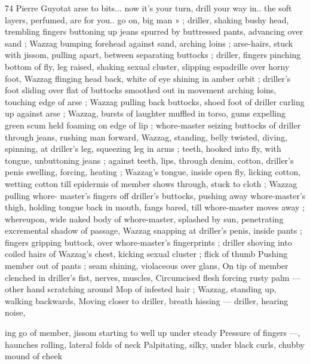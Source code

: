74 Pierre Guyotat
arse to bits... now it's your turn, drill your way in.. the soft layers,
perfumed, are for you.. go on, big man » ; driller, shaking bushy head,
trembling fingers buttoning up jeans spurred by buttressed pants,
advancing over sand ; Wazzag bumping forehead against sand,
arching loins ; arse-hairs, stuck with jissom, pulling apart, between
separating buttocks ; driller, fingers pinching bottom of fly, leg
raised, shaking sexual cluster, slipping espadrille over horny foot,
Wazzag flinging head back, white of eye shining in amber orbit ;
driller's foot sliding over flat of buttocks smoothed out in movement
arching loins, touching edge of arse ; Wazzag pulling back buttocks,
shoed foot of driller curling up against arse ; Wazzag, bursts of
laughter muffled in torso, gums expelling green scum held foaming
on edge of lip ; whore-master seizing buttocks of driller through
jeans, rushing man forward, Wazzag, standing, belly twisted, diving,
spinning, at driller's leg, squeezing leg in arms ; teeth, hooked into
fly, with tongue, unbuttoning jeans ; against teeth, lips, through
denim, cotton, driller's penis swelling, forcing, heating ; Wazzag's
tongue, inside open fly, licking cotton, wetting cotton till epidermis
of member shows through, stuck to cloth ; Wazzag pulling whore-
master's fingers off driller's buttocks, pushing away whore-master's
thigh, holding tongue back in mouth, fangs bared, till whore-master
moves away ; whereupon, wide naked body of whore-master,
splashed by sun, penetrating excremental shadow of passage,
Wazzag snapping at driller's penis, inside pants ; fingers gripping
buttock, over whore-master’s fingerprints ; driller shoving into coiled
hairs of Wazzag's chest, kicking sexual cluster ; flick of thumb
Pushing member out of pants ; seam shining, violaceous over glans,
On tip of member clenched in driller's fist, nerves, muscles,
Circumcised flesh forcing rusty palm — other hand scratching around
Mop of infested hair ; Wazzag, standing up, walking backwards,
Moving closer to driller, breath hissing — driller, hearing noise,

ing go of member, jissom starting to well up under steady
Pressure of fingers —, haunches rolling, lateral folds of neck
Palpitating, silky, under black curls, chubby mound of cheek

